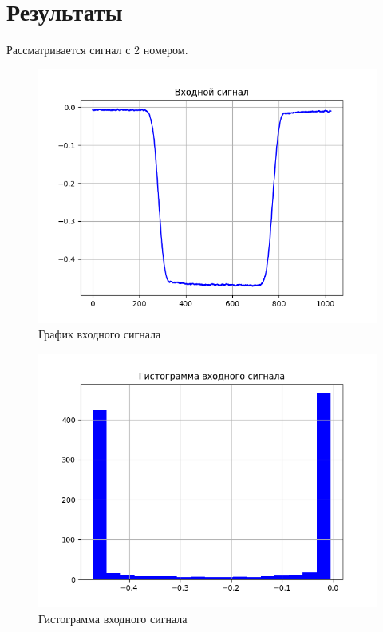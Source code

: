 \documentclass[12pt,a4paper]{article}
\begin{document}
\section {Результаты}
Рассматривается сигнал с 2 номером.
\begin{figure}[H]
    \centering
    \includegraphics[scale=0.8]{signal.png}
    \caption{График входного сигнала}
\end{figure}
\begin{figure}[H]
    \centering
    \includegraphics[scale=0.8]{hist.png}
    \caption{Гистограмма входного сигнала}
\end{figure}
\end{document}
